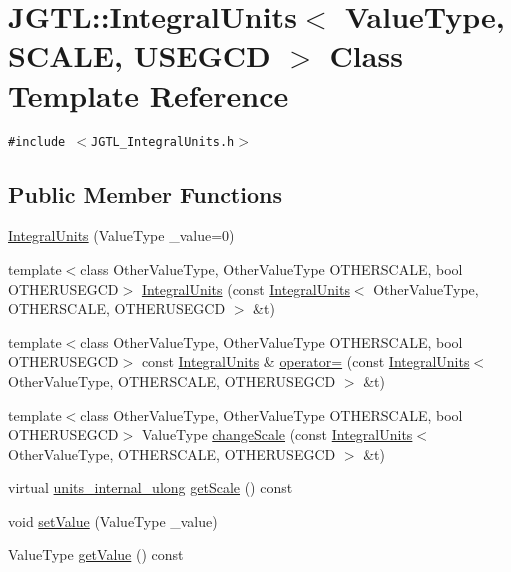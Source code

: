 \hypertarget{class_j_g_t_l_1_1_integral_units}{
\section{JGTL::Integral\-Units$<$ Value\-Type, SCALE, USEGCD $>$ Class Template Reference}
\label{class_j_g_t_l_1_1_integral_units}
}
{\tt \#include $<$JGTL\_\-Integral\-Units.h$>$}

\subsection*{Public Member Functions}
\begin{CompactItemize}
\item 
\hyperlink{class_j_g_t_l_1_1_integral_units_7a0b8ab1d60ee081001d9f60ca277ff0}{Integral\-Units} (Value\-Type \_\-value=0)
\item 
template$<$class Other\-Value\-Type, Other\-Value\-Type OTHERSCALE, bool OTHERUSEGCD$>$ \hyperlink{class_j_g_t_l_1_1_integral_units_281fe4bd63b000d4c79695bbf1296748}{Integral\-Units} (const \hyperlink{class_j_g_t_l_1_1_integral_units}{Integral\-Units}$<$ Other\-Value\-Type, OTHERSCALE, OTHERUSEGCD $>$ \&t)
\item 
template$<$class Other\-Value\-Type, Other\-Value\-Type OTHERSCALE, bool OTHERUSEGCD$>$ const \hyperlink{class_j_g_t_l_1_1_integral_units}{Integral\-Units} \& \hyperlink{class_j_g_t_l_1_1_integral_units_6aff5273f65110cf3bda1bea9d27c779}{operator=} (const \hyperlink{class_j_g_t_l_1_1_integral_units}{Integral\-Units}$<$ Other\-Value\-Type, OTHERSCALE, OTHERUSEGCD $>$ \&t)
\item 
template$<$class Other\-Value\-Type, Other\-Value\-Type OTHERSCALE, bool OTHERUSEGCD$>$ Value\-Type \hyperlink{class_j_g_t_l_1_1_integral_units_44144b6bf0109bf22d742c52fefaa63f}{change\-Scale} (const \hyperlink{class_j_g_t_l_1_1_integral_units}{Integral\-Units}$<$ Other\-Value\-Type, OTHERSCALE, OTHERUSEGCD $>$ \&t)
\item 
virtual \hyperlink{namespace_j_g_t_l_1924d6fd42e2d9661bc0b5a5063b99b3}{units\_\-internal\_\-ulong} \hyperlink{class_j_g_t_l_1_1_integral_units_c993e88b13af685bbd5a30975a0cfdc9}{get\-Scale} () const
\item 
void \hyperlink{class_j_g_t_l_1_1_integral_units_48ec23dc962dd95e11f6ff0b3ef76084}{set\-Value} (Value\-Type \_\-value)
\item 
Value\-Type \hyperlink{class_j_g_t_l_1_1_integral_units_38c178cd9a819a246614696fd8c9f982}{get\-Value} () const
\end{CompactItemize}
